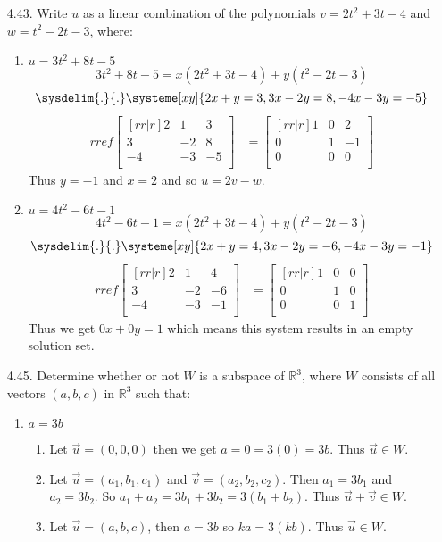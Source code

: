 \documentclass[12pt]{article}
\begin{document}
\begin{enumerate}
\begin{enumerate}
	\end{enumerate}
	
\pagebreak
\item[4.43.] Write $u$ as a linear combination of the polynomials $v=2t^2+3t-4$ and $w=t^2-2t-3$, where:
	\begin{enumerate}
	\item $u=3t^2+8t-5$\\
	\[ 3t^2+8t-5=x(2t^2+3t-4)+y(t^2-2t-3) \]
	\[ \sysdelim{.}{.}\systeme[xy]{2x+y=3,3x-2y=8,-4x-3y=-5} \]
	\begin{align*}
	rref\begin{bmatrix}[rr|r] 2&1&3\\3&-2&8\\-4&-3&-5\\ \end{bmatrix}
	&= \begin{bmatrix}[rr|r] 1&0&2\\0&1&-1\\0&0&0\\ \end{bmatrix}
	\end{align*}
	Thus $y=-1$ and $x=2$ and so $u = 2v-w$.

	\item $u=4t^2-6t-1$\\
	\[ 4t^2-6t-1=x(2t^2+3t-4)+y(t^2-2t-3) \]
	\[ \sysdelim{.}{.}\systeme[xy]{2x+y=4,3x-2y=-6,-4x-3y=-1} \]
	\begin{align*}
	rref\begin{bmatrix}[rr|r] 2&1&4\\3&-2&-6\\-4&-3&-1\\ \end{bmatrix}
	&= 	\begin{bmatrix}[rr|r] 1&0&0\\0&1&0\\0&0&1\\ \end{bmatrix}
	\end{align*}
	Thus we get $0x+0y=1$ which means this system results in an empty solution set.
	\end{enumerate}
	
\item[4.45.] Determine whether or not $W$ is a subspace of $\mathbb{R}^3$, where $W$ consists of all vectors $(a,b,c)$ in $\mathbb{R}^3$ such that:
	\begin{enumerate}
	\item $a=3b$
		\begin{enumerate}
		\item Let $\vec{u}=(0,0,0)$ then we get $a=0=3(0)=3b$. Thus $\vec{u} \in W$.
		\item Let $\vec{u}=(a_1,b_1,c_1)$ and $\vec{v}=(a_2,b_2,c_2)$. Then $a_1=3b_1$ and $a_2=3b_2$. So $a_1+a_2 = 3b_1 +3b_2 = 3(b_1+b_2)$. Thus $\vec{u}+\vec{v} \in W$.
		\item Let $\vec{u}=(a,b,c)$, then $a=3b$ so $ka=3(kb)$. Thus $\vec{u} \in W$.
		\end{enumerate}


\end{enumerate}
\end{enumerate}
\end{document}
